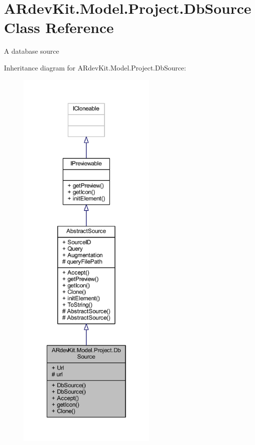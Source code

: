 \hypertarget{class_a_rdev_kit_1_1_model_1_1_project_1_1_db_source}{\section{A\-Rdev\-Kit.\-Model.\-Project.\-Db\-Source Class Reference}
\label{class_a_rdev_kit_1_1_model_1_1_project_1_1_db_source}
}


A database source  




Inheritance diagram for A\-Rdev\-Kit.\-Model.\-Project.\-Db\-Source\-:
\nopagebreak
\begin{figure}[H]
\begin{center}
\leavevmode
\includegraphics[height=550pt]{class_a_rdev_kit_1_1_model_1_1_project_1_1_db_source__inherit__graph}
\end{center}
\end{figure}


